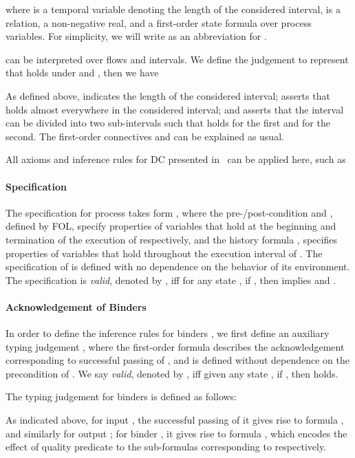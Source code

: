 \documentclass{llncs}
\begin{document}
where  is a temporal variable denoting the length
of the considered interval,  is a relation,   a non-negative real,
and   a first-order state formula over process variables. For simplicity, we will write
 as an abbreviation for .

 can be interpreted over flows and intervals. We define the judgement  to
represent that  holds under  and , then we have

 As defined above,
 indicates the length of the considered interval;
  asserts that
   holds almost everywhere in the considered interval;
and  asserts that the interval can be divided into two sub-intervals such that
 holds for the first and  for the second. The first-order connectives  and
 can be explained as usual.

All  axioms and inference rules for DC presented in~\cite{ZH04} can be applied here,  such as


\paragraph{\textbf{Specification}}
The specification for process  takes form
,
where  the pre-/post-condition  and , defined by FOL,
specify properties of
variables that hold at the beginning  and termination of the execution of  respectively,
 and the history formula , specifies properties of  variables
 that hold throughout the execution interval of . The specification of  is
 defined with no dependence on
the behavior of its environment.
The specification is \emph{valid}, denoted by
,
iff for any state , if , then  implies
 and .

 \paragraph{\textbf{Acknowledgement of Binders }}
In order to define the inference rules for binders , we first define
an auxiliary typing judgement ,
where  the first-order formula  describes the acknowledgement corresponding to successful passing of ,
and is defined without dependence on the precondition of .
We say  \emph{valid},
denoted by ,  iff
given any state , if , then
 holds.


The typing judgement for binders is defined as follows:

As indicated above, for input , the successful passing of it gives rise to formula , and similarly for
output ; for binder , it gives rise to
formula , which encodes the effect of quality
predicate  to the sub-formulas  corresponding to  respectively.
\end{document}
